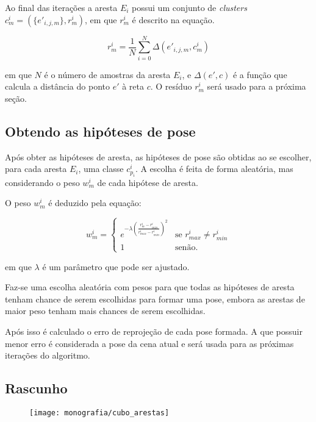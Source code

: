 Ao final das iterações a aresta $E_i$ possui um conjunto de \emph{clusters} $c^i_m = (\{e'_{i,j,m}\}, r^i_m)$, em que $r^i_m$ é descrito na equação.

\begin{equation}
r^i_m = \frac{1}{N} \sum^{N}_{i = 0} \Delta (e'_{i,j,m}, c^i_m)
\end{equation}

em que $N$ é o número de amostras da aresta $E_i$, e $\Delta (e', c)$ é a função que calcula a distância do ponto $e'$ à reta $c$. O resíduo $r^i_m$ será usado para a próxima seção.

\subsection{Obtendo as hipóteses de pose}

Após obter as hipóteses de aresta, as hipóteses de pose são obtidas ao se escolher, para cada aresta $E_i$, uma classe $c^i_{p_i}$. A escolha é feita de forma aleatória, mas considerando o peso $w^i_m$ de cada hipótese de aresta.

O peso $w^i_m$ é deduzido pela equação:

\begin{equation}
w^i_m = \begin{cases}
    e^{-\lambda \left( \frac{r^i_m - r^i_{min}}{r^i_{max} - r^i_{min}}\right)^2 } & \mbox{se } r^i_{max} \neq r^i_{min} \\
    1 & \mbox{senão}.
\end{cases}
\end{equation}

em que $\lambda$ é um parâmetro que pode ser ajustado.

Faz-se uma escolha aleatória com pesos para que todas as hipóteses de aresta tenham chance de serem escolhidas para formar uma pose, embora as arestas de maior peso tenham mais chances de serem escolhidas.

Após isso é calculado o erro de reprojeção de cada pose formada. A que possuir menor erro é considerada a pose da cena atual e será usada para as próximas iterações do algoritmo.

\subsection{Rascunho}

\begin{figure}[ht!]
\centering
\texttt{[image: monografia/cubo\_arestas]}
\caption{}
\label{cubo_arestas}
\end{figure}

